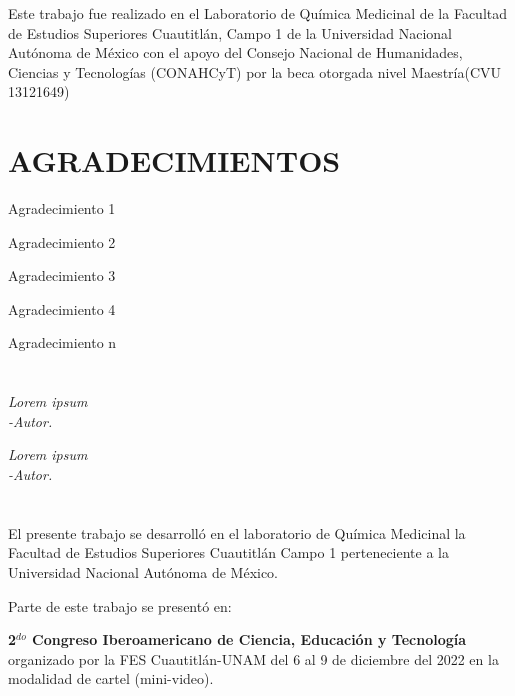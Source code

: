 \documentclass[12pt,oneside]{book} %
\begin{document}
	

	Este trabajo fue realizado en el Laboratorio de Química Medicinal de la Facultad de Estudios Superiores Cuautitlán, Campo 1 de la Universidad Nacional Autónoma de México con el apoyo del Consejo Nacional de Humanidades, Ciencias y Tecnologías (CONAHCyT) por la beca otorgada nivel Maestría(CVU 13121649) \cite{Iomini2021}
	
	\chapter*{} %
	\thispagestyle{empty}
		\begin{flushright} %
	
		\end{flushright}

	\chapter*{AGRADECIMIENTOS} %

\thispagestyle{empty}
Agradecimiento 1

Agradecimiento 2

Agradecimiento 3

Agradecimiento 4

Agradecimiento n

	\chapter*{} %
	\thispagestyle{empty}
		\begin{flushright} %
			\textit{Lorem ipsum
			\\[0.5cm]
			-Autor.}
		\end{flushright}
	\vspace{3cm}
		\begin{flushright} %
			\textit{Lorem ipsum
			\\[0.5cm]
			-Autor.}
		\end{flushright}
	\vspace{3cm}	
	\chapter*{} %
	\thispagestyle{empty}
		\begin{center} %
			El presente trabajo se desarrolló en el laboratorio de Química Medicinal la Facultad de Estudios Superiores Cuautitlán Campo 1 perteneciente a la Universidad Nacional Autónoma de México.
			
			\vspace{5cm}
			Parte de este trabajo se presentó en:
			
			\vspace{1cm}
			\textbf{2$^{do}$ Congreso Iberoamericano de Ciencia, Educación y Tecnología}\\
			organizado por la FES Cuautitlán-UNAM del 6 al 9 de diciembre del 2022 en la modalidad de cartel (mini-video).
		\end{center}
	\newpage
	\thispagestyle{empty}			
\end{document}
